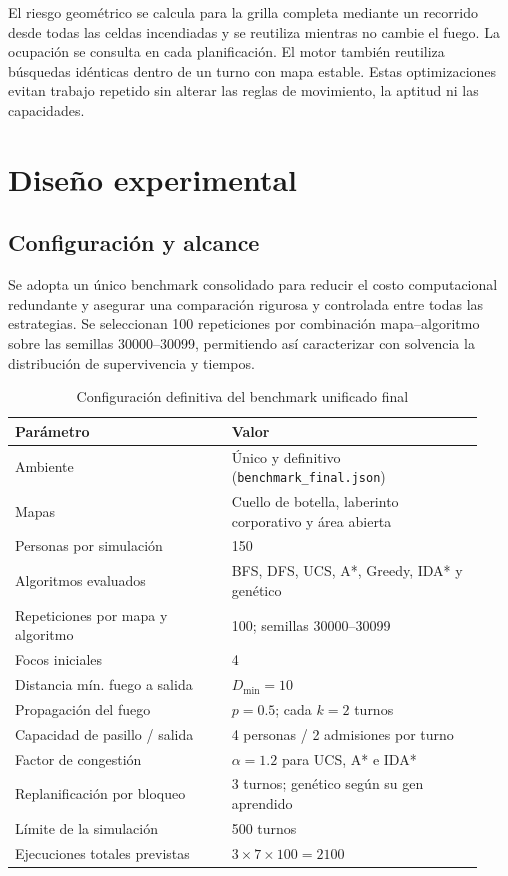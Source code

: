 \documentclass[11pt,letterpaper]{article}
\begin{document}
El riesgo geométrico se calcula para la grilla completa mediante un recorrido desde todas las celdas incendiadas y se reutiliza mientras no cambie el fuego. La ocupación se consulta en cada planificación. El motor también reutiliza búsquedas idénticas dentro de un turno con mapa estable. Estas optimizaciones evitan trabajo repetido sin alterar las reglas de movimiento, la aptitud ni las capacidades.

\section{Diseño experimental}

\subsection{Configuración y alcance}
Se adopta un único benchmark consolidado para reducir el costo computacional redundante y asegurar una comparación rigurosa y controlada entre todas las estrategias. Se seleccionan 100 repeticiones por combinación mapa--algoritmo sobre las semillas 30000--30099, permitiendo así caracterizar con solvencia la distribución de supervivencia y tiempos.

\begin{table}[htbp]
\centering
\caption{Configuración definitiva del benchmark unificado final}
\begin{tabular}{@{}p{0.43\linewidth}p{0.50\linewidth}@{}}
\toprule
Parámetro & Valor \\
\midrule
Ambiente & Único y definitivo (\texttt{benchmark\_final.json}) \\
Mapas & Cuello de botella, laberinto corporativo y área abierta \\
Personas por simulación & 150 \\
Algoritmos evaluados & BFS, DFS, UCS, A*, Greedy, IDA* y genético \\
Repeticiones por mapa y algoritmo & 100; semillas 30000--30099 \\
Focos iniciales & 4 \\
Distancia mín. fuego a salida & $D_{\min} = 10$ \\
Propagación del fuego & $p=0.5$; cada $k=2$ turnos \\
Capacidad de pasillo / salida & 4 personas / 2 admisiones por turno \\
Factor de congestión & $\alpha=1.2$ para UCS, A* e IDA* \\
Replanificación por bloqueo & 3 turnos; genético según su gen aprendido \\
Límite de la simulación & 500 turnos \\
Ejecuciones totales previstas & $3\times7\times100=2100$ \\
\bottomrule
\end{tabular}
\end{table}
\end{document}

